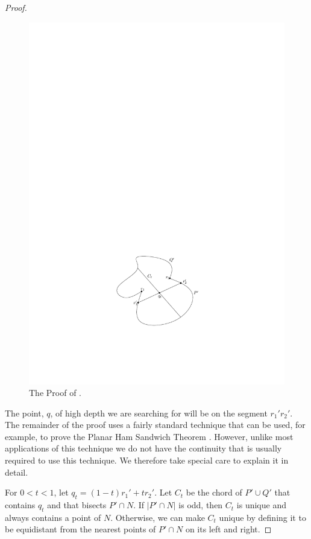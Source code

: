 \documentclass{birkjour}
\begin{document}
\begin{proof}
\begin{figure}
  \begin{center}
    \includegraphics{2089-figure3}
  \end{center}
  \caption{The Proof of .}
\end{figure}

The point, $q$, of high depth we are searching for will be on the
segment $r_1'r_2'$. The remainder of the proof uses a fairly standard
technique that can be used, for example, to prove the Planar Ham
Sandwich Theorem \cite{m03}. However, unlike most applications of this
technique we do not have the continuity that is usually required to
use this technique.  We therefore take special care to explain it in
detail.
 
For $0< t< 1$, let $q_t = (1-t)r_1'+ tr_2'$.  Let $C_t$ be the chord of
$P'\cup Q'$ that contains $q_t$ and that bisects $P'\cap N$.  If
$|P'\cap N|$ is odd, then $C_t$ is unique and always contains a point
of $N$.  Otherwise, we can make $C_t$ unique by defining it to be
equidistant from the nearest points of $P'\cap N$ on its left and
right.


\end{proof}
\end{document}
